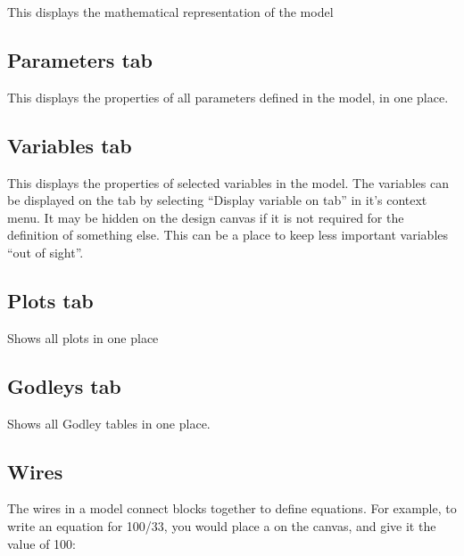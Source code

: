\label{tabs:Equations}

This displays the mathematical representation of the model

\subsection{Parameters tab}

\label{tabs:Parameters}

This displays the properties of all parameters defined in the model,
in one place.

\subsection{Variables tab}

\label{tabs:Variables}

This displays the properties of selected variables in the model. The
variables can be displayed on the tab by selecting ``Display variable
on tab'' in it's context menu. It may be hidden on the design canvas
if it is not required for the definition of something else. This can
be a place to keep less important variables ``out of sight''.

\subsection{Plots tab}

\label{tabs:Plots}

Shows all plots in one place

\subsection{Godleys tab}

\label{tabs:Godleys}

Shows all Godley tables in one place.

\subsection{Wires}

\label{Wires}

The wires in a model connect blocks together to define equations.
For example, to write an equation for 100/33, you would place a 
on the canvas, and give it the value of 100:
\begin{center}
\par\end{center}


